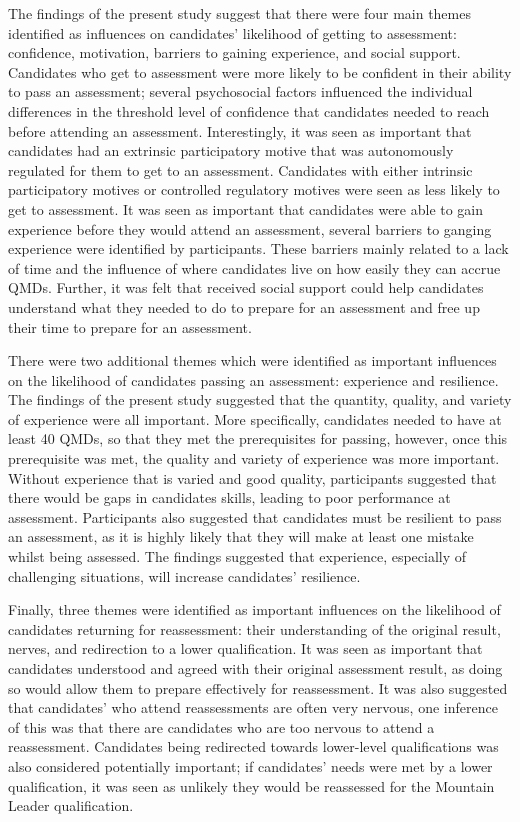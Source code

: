 \documentclass[
  12pt,
  a4paper,
]{book}
\begin{document}
The findings of the present study suggest that there were four main themes identified as influences on candidates' likelihood of getting to assessment: confidence, motivation, barriers to gaining experience, and social support. Candidates who get to assessment were more likely to be confident in their ability to pass an assessment; several psychosocial factors influenced the individual differences in the threshold level of confidence that candidates needed to reach before attending an assessment. Interestingly, it was seen as important that candidates had an extrinsic participatory motive that was autonomously regulated for them to get to an assessment. Candidates with either intrinsic participatory motives or controlled regulatory motives were seen as less likely to get to assessment. It was seen as important that candidates were able to gain experience before they would attend an assessment, several barriers to ganging experience were identified by participants. These barriers mainly related to a lack of time and the influence of where candidates live on how easily they can accrue QMDs. Further, it was felt that received social support could help candidates understand what they needed to do to prepare for an assessment and free up their time to prepare for an assessment.

There were two additional themes which were identified as important influences on the likelihood of candidates passing an assessment: experience and resilience. The findings of the present study suggested that the quantity, quality, and variety of experience were all important. More specifically, candidates needed to have at least 40 QMDs, so that they met the prerequisites for passing, however, once this prerequisite was met, the quality and variety of experience was more important. Without experience that is varied and good quality, participants suggested that there would be gaps in candidates skills, leading to poor performance at assessment. Participants also suggested that candidates must be resilient to pass an assessment, as it is highly likely that they will make at least one mistake whilst being assessed. The findings suggested that experience, especially of challenging situations, will increase candidates' resilience.

Finally, three themes were identified as important influences on the likelihood of candidates returning for reassessment: their understanding of the original result, nerves, and redirection to a lower qualification. It was seen as important that candidates understood and agreed with their original assessment result, as doing so would allow them to prepare effectively for reassessment. It was also suggested that candidates' who attend reassessments are often very nervous, one inference of this was that there are candidates who are too nervous to attend a reassessment. Candidates being redirected towards lower-level qualifications was also considered potentially important; if candidates' needs were met by a lower qualification, it was seen as unlikely they would be reassessed for the Mountain Leader qualification.
\end{document}
